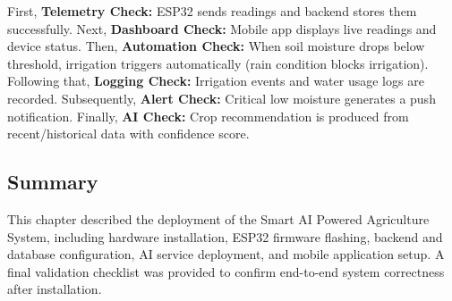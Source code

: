 First, \textbf{Telemetry Check:} ESP32 sends readings and backend stores them successfully. Next, \textbf{Dashboard Check:} Mobile app displays live readings and device status. Then, \textbf{Automation Check:} When soil moisture drops below threshold, irrigation triggers automatically (rain condition blocks irrigation). Following that, \textbf{Logging Check:} Irrigation events and water usage logs are recorded. Subsequently, \textbf{Alert Check:} Critical low moisture generates a push notification. Finally, \textbf{AI Check:} Crop recommendation is produced from recent/historical data with confidence score.


\subsection{Summary}
\label{sec:chapter5-summary}

This chapter described the deployment of the Smart AI Powered Agriculture System, including hardware installation, ESP32 firmware flashing, backend and database configuration, AI service deployment, and mobile application setup. A final validation checklist was provided to confirm end-to-end system correctness after installation.

\setcounter{chapter}{5}